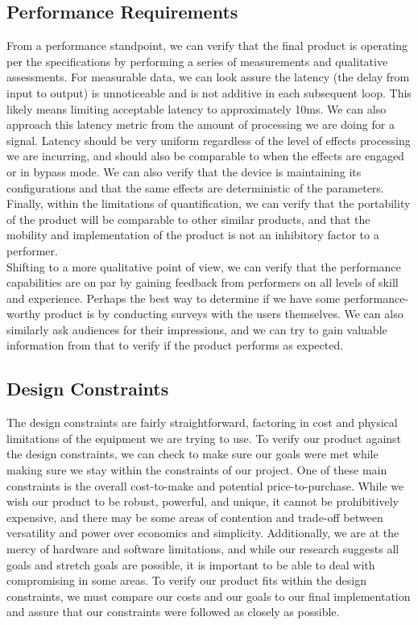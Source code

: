\subsection{Performance Requirements}
From a performance standpoint, we can verify that the final product is operating per the specifications by performing a series of measurements and qualitative assessments. For measurable data, we can look assure the latency (the delay from input to output) is unnoticeable and is not additive in each subsequent loop. This likely means limiting acceptable latency to approximately 10ms. We can also approach this latency metric from the amount of processing we are doing for a signal. Latency should be very uniform regardless of the level of effects processing we are incurring, and should also be comparable to when the effects are engaged or in bypass mode. We can also verify that the device is maintaining its configurations and that the same effects are deterministic of the parameters. Finally, within the limitations of quantification, we can verify that the portability of the product will be comparable to other similar products, and that the mobility and implementation of the product is not an inhibitory factor to a performer. \\
Shifting to a more qualitative point of view, we can verify that the performance capabilities are on par by gaining feedback from performers on all levels of skill and experience. Perhaps the best way to determine if we have some performance-worthy product is by conducting surveys with the users themselves. We can also similarly ask audiences for their impressions, and we can try to gain valuable information from that to verify if the product performs as expected. 


\subsection{Design Constraints}
The design constraints are fairly straightforward, factoring in cost and physical limitations of the equipment we are trying to use. To verify our product against the design constraints, we can check to make sure our goals were met while making sure we stay within the constraints of our project. One of these main constraints is the overall cost-to-make and potential price-to-purchase. While we wish our product to be robust, powerful, and unique, it cannot be prohibitively expensive, and there may be some areas of contention and trade-off between versatility and power over economics and simplicity. Additionally, we are at the mercy of hardware and software limitations, and while our research suggests all goals and stretch goals are possible, it is important to be able to deal with compromising in some areas. To verify our product fits within the design constraints, we must compare our costs and our goals to our final implementation and assure that our constraints were followed as closely as possible. 

